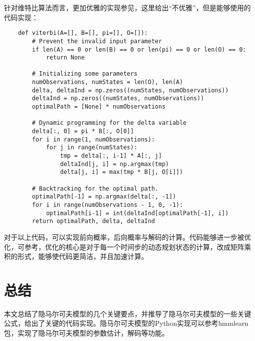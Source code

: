 \documentclass[UTF8, 12pt]{ctexart}
\begin{document}
	针对维特比算法而言，更加优雅的实现参见\cite{bworld}，这里给出“不优雅”，但是能够使用的代码实现：
	\begin{lstlisting}
	def viterbi(A=[], B=[], pi=[], O=[]):
		# Prevent the invalid input parameter
		if len(A) == 0 or len(B) == 0 or len(pi) == 0 or len(O) == 0:
			return None
	
		# Initializing some parameters
		numObservations, numStates = len(O), len(A)
		delta, deltaInd = np.zeros((numStates, numObservations))
		deltaInd = np.zeros((numStates, numObservations))
		optimalPath = [None] * numObservations
	
		# Dynamic programming for the delta variable
		delta[:, 0] = pi * B[:, O[0]]
		for i in range(1, numObservations):
			for j in range(numStates):
				tmp = delta[:, i-1] * A[:, j]
				deltaInd[j, i] = np.argmax(tmp)
				delta[j, i] = max(tmp * B[j, O[i]])
		
		# Backtracking for the optimal path.
		optimalPath[-1] = np.argmax(delta[:, -1])
		for i in range(numObservations - 1, 0, -1):
			optimalPath[i-1] = int(deltaInd[optimalPath[-1], i])
		return optimalPath, delta, deltaInd
	\end{lstlisting}
	对于以上代码，可以实现前向概率，后向概率与解码的计算。代码能够进一步被优化，可参考\cite{bworld}，优化的核心是对于每一个时间步的动态规划状态的计算，改成矩阵乘积的形式，能够使代码更简洁，并且加速计算。
	
	\section{总结}
	本文总结了隐马尔可夫模型的几个关键要点，并推导了隐马尔可夫模型的一些关键公式，给出了关键的代码实现。隐马尔可夫模型的Python实现可以参考hmmlearn包\cite{hmmlearn}，实现了隐马尔可夫模型的参数估计，解码等功能。
	

  
\end{document}
